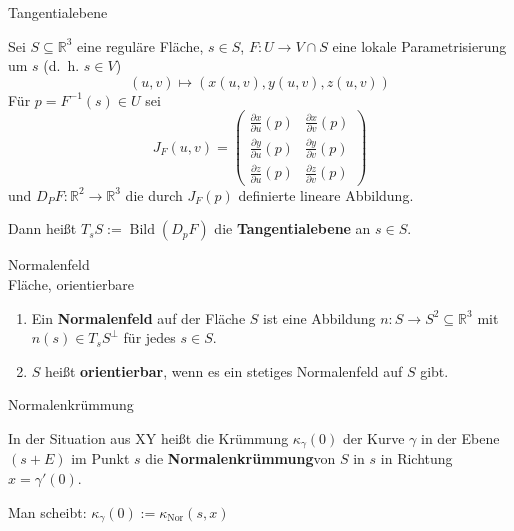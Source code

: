 \documentclass[mycards,frame]{flashcards}
\def\mdr{\ensuremath{\mathbb{R}}}
\DeclareMathOperator{\Bild}{Bild}
\begin{document}
\begin{flashcard}{ Tangentialebene }
{ %
    Sei $S \subseteq \mdr^3$ eine reguläre Fläche, $s \in S$,
    $F: U \rightarrow V \cap S$ eine lokale Parametrisierung um $s$
    (d.~h. $s \in V$)
    \[(u,v) \mapsto (x(u,v), y(u,v), z(u,v))\]
    Für $p=F^{-1}(s) \in U$ sei
    \[        J_F(u,v) = \begin{pmatrix}
            \frac{\partial x}{\partial u} (p) & \frac{\partial x}{\partial v} (p)\\
            \frac{\partial y}{\partial u} (p) & \frac{\partial y}{\partial v} (p)\\
            \frac{\partial z}{\partial u} (p) & \frac{\partial z}{\partial v} (p)
        \end{pmatrix}\]
    und $D_P F: \mdr^2 \rightarrow \mdr^3$ die durch $J_F (p)$
    definierte lineare Abbildung.

    Dann heißt $T_s S := \Bild(D_p F)$ die \textbf{Tangentialebene}
    an $s \in S$.
 }
\end{flashcard}

\begin{flashcard}{ Normalenfeld\\Fläche, orientierbare }
{ %
    \begin{enumerate}[label=\alph*)]
        \item Ein \textbf{Normalenfeld} auf der
              Fläche $S$ ist eine Abbildung $n: S \rightarrow S^2 \subseteq \mdr^3$
              mit $n(s) \in T_s S^\perp$ für jedes $s \in S$.
        \item $S$ heißt \textbf{orientierbar},
              wenn es ein stetiges Normalenfeld auf $S$ gibt.
    \end{enumerate}
 }
\end{flashcard}

\begin{flashcard}{ Normalenkrümmung }
{
    In der Situation aus XY heißt die Krümmung $\kappa_\gamma(0)$
    der Kurve $\gamma$ in der Ebene $(s+ E)$ im Punkt $s$ die
    \textbf{Normalenkrümmung}\footnotemark von $S$ in $s$ in Richtung
    $x = \gamma'(0)$.

    Man scheibt: $\kappa_\gamma(0) := \kappa_{\text{Nor}}(s, x)$
 }
\end{flashcard}
\end{document}
